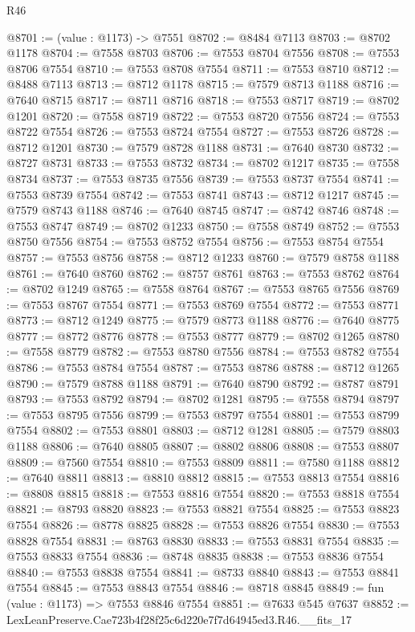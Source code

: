 \begin{lexlean}{R46}
\begin{coremodule}
@8701 := (value : @1173) -> @7551
@8702 := @8484 @7113
@8703 := @8702 @1178
@8704 := @7558 @8703
@8706 := @7553 @8704 @7556
@8708 := @7553 @8706 @7554
@8710 := @7553 @8708 @7554
@8711 := @7553 @8710
@8712 := @8488 @7113
@8713 := @8712 @1178
@8715 := @7579 @8713 @1188
@8716 := @7640 @8715
@8717 := @8711 @8716
@8718 := @7553 @8717
@8719 := @8702 @1201
@8720 := @7558 @8719
@8722 := @7553 @8720 @7556
@8724 := @7553 @8722 @7554
@8726 := @7553 @8724 @7554
@8727 := @7553 @8726
@8728 := @8712 @1201
@8730 := @7579 @8728 @1188
@8731 := @7640 @8730
@8732 := @8727 @8731
@8733 := @7553 @8732
@8734 := @8702 @1217
@8735 := @7558 @8734
@8737 := @7553 @8735 @7556
@8739 := @7553 @8737 @7554
@8741 := @7553 @8739 @7554
@8742 := @7553 @8741
@8743 := @8712 @1217
@8745 := @7579 @8743 @1188
@8746 := @7640 @8745
@8747 := @8742 @8746
@8748 := @7553 @8747
@8749 := @8702 @1233
@8750 := @7558 @8749
@8752 := @7553 @8750 @7556
@8754 := @7553 @8752 @7554
@8756 := @7553 @8754 @7554
@8757 := @7553 @8756
@8758 := @8712 @1233
@8760 := @7579 @8758 @1188
@8761 := @7640 @8760
@8762 := @8757 @8761
@8763 := @7553 @8762
@8764 := @8702 @1249
@8765 := @7558 @8764
@8767 := @7553 @8765 @7556
@8769 := @7553 @8767 @7554
@8771 := @7553 @8769 @7554
@8772 := @7553 @8771
@8773 := @8712 @1249
@8775 := @7579 @8773 @1188
@8776 := @7640 @8775
@8777 := @8772 @8776
@8778 := @7553 @8777
@8779 := @8702 @1265
@8780 := @7558 @8779
@8782 := @7553 @8780 @7556
@8784 := @7553 @8782 @7554
@8786 := @7553 @8784 @7554
@8787 := @7553 @8786
@8788 := @8712 @1265
@8790 := @7579 @8788 @1188
@8791 := @7640 @8790
@8792 := @8787 @8791
@8793 := @7553 @8792
@8794 := @8702 @1281
@8795 := @7558 @8794
@8797 := @7553 @8795 @7556
@8799 := @7553 @8797 @7554
@8801 := @7553 @8799 @7554
@8802 := @7553 @8801
@8803 := @8712 @1281
@8805 := @7579 @8803 @1188
@8806 := @7640 @8805
@8807 := @8802 @8806
@8808 := @7553 @8807
@8809 := @7560 @7554
@8810 := @7553 @8809
@8811 := @7580 @1188
@8812 := @7640 @8811
@8813 := @8810 @8812
@8815 := @7553 @8813 @7554
@8816 := @8808 @8815
@8818 := @7553 @8816 @7554
@8820 := @7553 @8818 @7554
@8821 := @8793 @8820
@8823 := @7553 @8821 @7554
@8825 := @7553 @8823 @7554
@8826 := @8778 @8825
@8828 := @7553 @8826 @7554
@8830 := @7553 @8828 @7554
@8831 := @8763 @8830
@8833 := @7553 @8831 @7554
@8835 := @7553 @8833 @7554
@8836 := @8748 @8835
@8838 := @7553 @8836 @7554
@8840 := @7553 @8838 @7554
@8841 := @8733 @8840
@8843 := @7553 @8841 @7554
@8845 := @7553 @8843 @7554
@8846 := @8718 @8845
@8849 := fun (value : @1173) => @7553 @8846 @7554
@8851 := @7633 @545 @7637
@8852 := LexLeanPreserve.Cae723b4f28f25c6d220e7f7d64945ed3.R46.__fits_17

\end{coremodule}
\end{lexlean}
